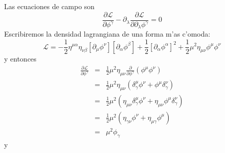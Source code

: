 Las ecuaciones de campo son
\begin{equation}
\frac{\partial \mathcal{L}}{\partial \phi ^{\gamma }}-\partial _{\lambda }%
\frac{\partial \mathcal{L}}{\partial \partial _{\lambda }\phi ^{\gamma }}=0
\end{equation}
Escribiremos la densidad lagrangiana de una forma m'as c'omoda:
\begin{equation}
\mathcal{L}=-\frac{1}{2}\eta ^{\mu \alpha }\eta _{\nu \beta }\left[ \partial
_{\mu }\phi ^{\nu }\right] \left[ \partial _{\alpha }\phi ^{\beta }\right] +%
\frac{1}{2}\left[ \partial _{\alpha }\phi ^{\alpha }\right] ^{2}+\frac{1}{2}%
\mu ^{2}\eta _{\mu \nu }\phi ^{\mu }\phi ^{\nu }
\end{equation}
y entonces
\begin{eqnarray*}
\frac{\partial \mathcal{L}}{\partial \phi ^{\gamma }} &=&\frac{1}{2}\mu
^{2}\eta _{\mu \nu }\frac{\partial }{\partial \phi ^{\gamma }}\left( \phi
^{\mu }\phi ^{\nu }\right) \\
&=&\frac{1}{2}\mu ^{2}\eta _{\mu \nu }\left( \delta _{\gamma }^{\mu }\phi
^{\nu }+\phi ^{\mu }\delta _{\gamma }^{\nu }\right) \\
&=&\frac{1}{2}\mu ^{2}\left( \eta _{\mu \nu }\delta _{\gamma }^{\mu }\phi
^{\nu }+\eta _{\mu \nu }\phi ^{\mu }\delta _{\gamma }^{\nu }\right) \\
&=&\frac{1}{2}\mu ^{2}\left( \eta _{\gamma \nu }\phi ^{\nu }+\eta _{\mu
\gamma }\phi ^{\mu }\right) \\
&=&\mu ^{2}\phi _{\gamma }
\end{eqnarray*}
y
